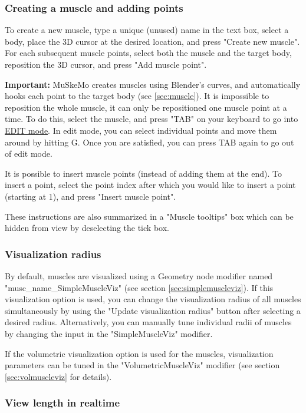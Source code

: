 \documentclass{article}
\begin{document}
\subsubsection{Creating a muscle and adding points}

To create a new muscle, type a unique (unused) name in the text box, select a body, place the 3D cursor at the desired location, and press "Create new muscle". For each subsequent muscle points, select both the muscle and the target body, reposition the 3D cursor, and press "Add muscle point".

\textbf{Important:} MuSkeMo creates muscles using Blender's curves, and automatically hooks each point to the target body (see \ref{sec:muscle}). It is impossible to reposition the whole muscle, it can only be repositioned one muscle point at a time. To do this, select the muscle, and press "TAB" on your keyboard to go into \href{https://docs.blender.org/manual/en/latest/editors/3dview/modes.html}{EDIT mode}. In edit mode, you can select individual points and move them around by hitting G. Once you are satisfied, you can press TAB again to go out of edit mode.

It is possible to insert muscle points (instead of adding them at the end). To insert a point, select the point index after which you would like to insert a point (starting at 1), and press "Insert muscle point".

These instructions are also summarized in a "Muscle tooltips" box which can be hidden from view by deselecting the tick box.


\subsubsection{Visualization radius}
By default, muscles are visualized using a Geometry node modifier named "musc\_name\_SimpleMuscleViz" (see section \ref{sec:simplemuscleviz}). If this visualization option is used, you can change the visualization radius of all muscles simultaneously by using the "Update visualization radius" button after selecting a desired radius. Alternatively, you can manually tune individual radii of muscles by changing the input in the "SimpleMuscleViz" modifier.

If the volumetric visualization option is used for the muscles, visualization parameters can be tuned in the "VolumetricMuscleViz" modifier (see section \ref{sec:volmuscleviz} for details).

\subsubsection{View length in realtime}
\end{document}
